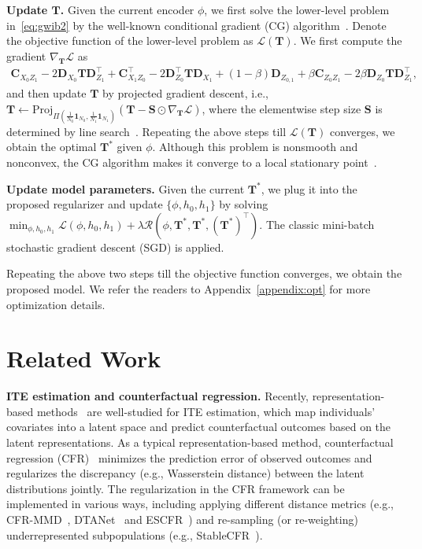 \documentclass{article}
\begin{document}
\textbf{Update $\bm{T}$.} Given the current encoder $\phi$, we first solve the lower-level problem in~\eqref{eq:gwib2} by the well-known conditional gradient (CG) algorithm~\cite{titouan2019optimal}. 
Denote the objective function of the lower-level problem as $\mathcal{L}(\bm{T})$. 
We first compute the gradient $\nabla_{\bm{T}}\mathcal{L}$ as
\begin{eqnarray*}  
\bm{C}_{X_0Z_1}-2\bm{D}_{X_0}\bm{T}\bm{D}_{Z_1}^{\top}+\bm{C}_{X_1Z_0}^{\top}-2\bm{D}_{Z_0}^{\top}\bm{T}\bm{D}_{X_1}+(1-\beta)\bm{D}_{Z_{0,1}}+\beta\bm{C}_{Z_0Z_1}-2\beta\bm{D}_{Z_0}\bm{T}\bm{D}_{Z_1}^{\top},
\end{eqnarray*}
and then update $\bm{T}$ by projected gradient descent, i.e., $\bm{T}\leftarrow \text{Proj}_{\Pi(\frac{1}{N_0}\bm{1}_{N_0},\frac{1}{N_{1}}\bm{1}_{N_{1}})}(\bm{T}-\bm{S}\odot\nabla_{\bm{T}}\mathcal{L})$, where the elementwise step size $\bm{S}$ is determined by line search~\cite{dessein2018regularized}.
Repeating the above steps till $\mathcal{L}(\bm{T})$ converges, we obtain the optimal $\bm{T}^*$ given $\phi$.
Although this problem is nonsmooth and nonconvex, the CG algorithm makes it converge to a local stationary point~\cite{lacoste2016convergence}. 


\textbf{Update model parameters.} Given the current $\bm{T}^*$, we plug it into the proposed regularizer and update $\{\phi,h_0,h_1\}$ by solving $\min_{\phi,h_0,h_1}\mathcal{L}(\phi,h_0,h_1)+\lambda\mathcal{R}(\phi,\bm{T}^*,\bm{T}^*,(\bm{T}^*)^{\top})$. 
The classic mini-batch stochastic gradient descent (SGD) is applied.

Repeating the above two steps till the objective function converges, we obtain the proposed model.
We refer the readers to Appendix~\ref{appendix:opt} for more optimization details.

\section{Related Work}
\textbf{ITE estimation and counterfactual regression.} 
Recently, representation-based methods~\cite{johansson2016learning} are well-studied for ITE estimation, which map individuals' covariates into a latent space and predict counterfactual outcomes based on the latent representations. 
As a typical representation-based method, counterfactual regression (CFR)~\cite{shalit2017estimating} minimizes the prediction error of observed outcomes and regularizes the discrepancy (e.g., Wasserstein distance) between the latent distributions jointly. 
The regularization in the CFR framework can be implemented in various ways, including applying different distance metrics (e.g., CFR-MMD~\cite{shalit2017estimating}, DTANet~\cite{li2022deep} and ESCFR~\cite{wang2023optimal}) and re-sampling (or re-weighting) underrepresented subpopulations (e.g., StableCFR~\cite{wu2023stable}).
\end{document}
